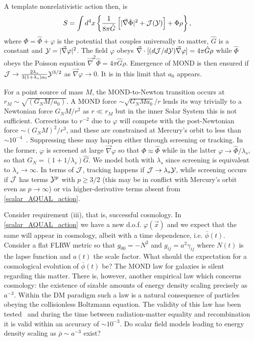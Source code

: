 \documentclass[twocolumn,prl,preprintnumbers,amsmath,amssymb,nofootinbib]{revtex4-2}
\newcommand{\grad}{\ensuremath{\vec{\nabla}}}
\newcommand{\rhob}{{\bar{\rho}}}
\newcommand{\phib}{{\bar{\phi}}}
\newcommand{\lambdas}{\lambda_s}
\newcommand{\PhiE}{\hat{\Phi}}
\newcommand{\Ycal}{{\cal Y}}
\newcommand{\Jcal}{{\cal J}}
\newcommand{\Gqs}{\ensuremath{\hat{G}}}
\newcommand{\GN}{\ensuremath{G_{N}}}
\begin{document}
 A template nonrelativistic action then, is
\begin{equation}
S =  \int d^4x  \left\{
  \frac{1}{8\pi \Gqs} \left[ |\grad\PhiE|^2 
+ \Jcal(\Ycal)
\right]
+  \Phi \rho\right\},
\label{scalar_AQUAL_action}
\end{equation}
where $\Phi = \PhiE + \varphi$ is the potential that couples universally to matter, $\Gqs$ is a constant and $\Ycal = |\grad\varphi|^2$.
The field  $\varphi$ obeys \; \;$\grad \cdot[ (d\Jcal/d\Ycal)\grad\varphi] = 4 \pi \Gqs \rho$ while  $\PhiE$ obeys the Poisson equation  $\grad^2 \PhiE = 4 \pi \Gqs \rho$.
Emergence of MOND is then ensured if $\Jcal \rightarrow \frac{2 \lambdas}{3 (1 + \lambdas) a_0} \Ycal^{3/2}$ as $\grad\varphi\rightarrow 0$. It is in this limit that $a_0$ appears.

For a point source of mass $M$, the MOND-to-Newton transition occurs at $r_M \sim  \sqrt{(\GN M/a_0)}$.
A MOND force $\sim \sqrt{\GN M a_0}/r$ lends its way trivially to a Newtonian force $\GN M/r^2$  as $r\ll r_M$ but in the inner Solar System
this is not sufficient. Corrections to $r^{-2}$ due to $\varphi$ will compete with  the post-Newtonian force  $\sim (\GN M)^2/r^3$, and these are constrained
at Mercury's orbit to less than $\sim10^{-4}$~\cite{Will2014,Will2018}.  
Suppressing these may happen either through screening or tracking. In the former,  $\varphi$ is screened 
at large $\grad\varphi$  so that $\Phi \approx \PhiE$ while in the latter $\varphi \rightarrow \PhiE/\lambdas$, so that $\GN = (1+ 1/ \lambdas)\Gqs $. We model both with $\lambdas$  since screening is equivalent to $\lambdas\rightarrow \infty$.
In terms of $\Jcal$, tracking happens if $\Jcal \rightarrow \lambdas \Ycal$, 
while screening occurs if $\Jcal$ has terms $\Ycal^p$ with $p\ge 3/2$ (this may be in conflict with Mercury's orbit even as $p\rightarrow \infty$) or via higher-derivative terms absent from \eqref{scalar_AQUAL_action}. 




Consider requirement (iii), that is, successful  cosmology. 
In \eqref{scalar_AQUAL_action} we have a new d.o.f. $\varphi(\vec{x})$ and we expect that the same will appear in cosmology,
albeit with a time dependence, i.e. $\phib(t)$.
Consider a flat FLRW metric so that  $g_{00} = -N^2$ and $g_{ij} = a^2 \gamma_{ij}$  where $N(t)$ is the lapse function and $a(t)$ 
the scale factor. What should the expectation for
a cosmological evolution of $\phib(t)$ be? The MOND law for galaxies is silent regarding this matter. There is, however, another empirical 
law which concerns cosmology:
the existence of sizable amounts of energy density scaling precisely as $a^{-3}$. Within the DM paradigm such a law is a natural consequence of 
particles obeying the collisionless Boltzmann equation. The validity of this law has been tested~\cite{KoppEtAl2018,IlicEtAl2020} and 
during the time between radiation-matter equality and recombination it is valid within
an accuracy of $\sim 10^{-3}$. Do scalar field models leading to energy density scaling as $\rhob \sim a^{-3}$ exist?
\end{document}
